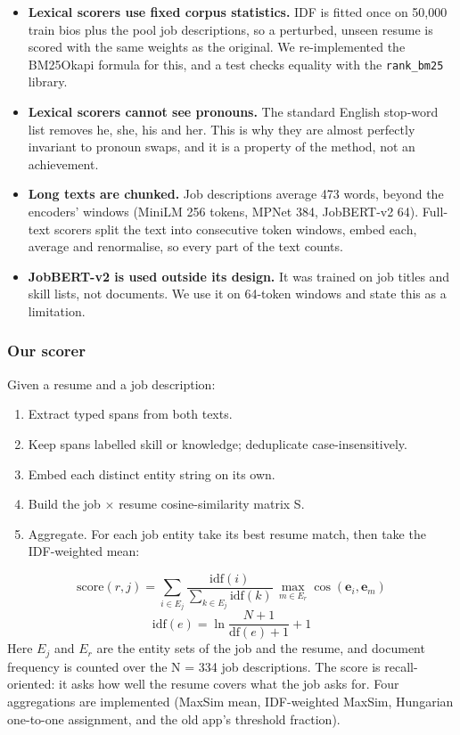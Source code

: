 \documentclass[conference,a4paper]{IEEEtran}
\begin{document}
\begin{itemize}
\item \textbf{Lexical scorers use fixed corpus statistics.} IDF is fitted once on 50,000 train bios plus the pool job descriptions, so a perturbed, unseen resume is scored with the same weights as the original. We re-implemented the BM25Okapi formula for this, and a test checks equality with the \texttt{rank\_\allowbreak{}bm25} library.
\item \textbf{Lexical scorers cannot see pronouns.} The standard English stop-word list removes he, she, his and her. This is why they are almost perfectly invariant to pronoun swaps, and it is a property of the method, not an achievement.
\item \textbf{Long texts are chunked.} Job descriptions average 473 words, beyond the encoders' windows (MiniLM 256 tokens, MPNet 384, JobBERT-v2 64). Full-text scorers split the text into consecutive token windows, embed each, average and renormalise, so every part of the text counts.
\item \textbf{JobBERT-v2 is used outside its design.} It was trained on job titles and skill lists, not documents. We use it on 64-token windows and state this as a limitation.
\end{itemize}
\subsubsection{Our scorer} Given a resume and a job description:

\begin{enumerate}
\item Extract typed spans from both texts.
\item Keep spans labelled skill or knowledge; deduplicate case-insensitively.
\item Embed each distinct entity string on its own.
\item Build the job $\times$ resume cosine-similarity matrix S.
\item Aggregate. For each job entity take its best resume match, then take the IDF-weighted mean:
\end{enumerate}
\begin{equation}
\mathrm{score}(r, j) = \sum_{i \in E_j} \frac{\mathrm{idf}(i)}{\sum_{k \in E_j} \mathrm{idf}(k)} \, \max_{m \in E_r} \cos(\mathbf{e}_i, \mathbf{e}_m)
\end{equation}
\begin{equation}
\mathrm{idf}(e) = \ln\frac{N + 1}{\mathrm{df}(e) + 1} + 1
\end{equation}
Here $E_j$ and $E_r$ are the entity sets of the job and the resume, and document frequency is counted over the N = 334 job descriptions. The score is recall-oriented: it asks how well the resume covers what the job asks for. Four aggregations are implemented (MaxSim mean, IDF-weighted MaxSim, Hungarian one-to-one assignment, and the old app's threshold fraction).
\end{document}
